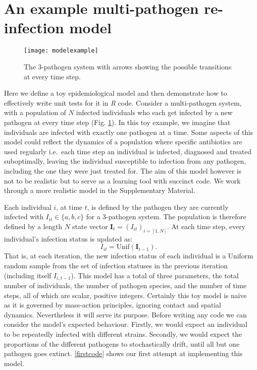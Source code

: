 \documentclass[]{elsarticle} %
\begin{document}
\hypertarget{an-example-multi-pathogen-re-infection-model}{%
\section{An example multi-pathogen re-infection model}\label{an-example-multi-pathogen-re-infection-model}}

\begin{figure}[h]

{\centering \texttt{[image: modelexample]} 

}

\caption{The 3-pathogen system with arrows showing the possible transitions at every time step.}\label{fig:modelexample}
\end{figure}

Here we define a toy epidemiological model and then demonstrate how to effectively write unit tests for it in \emph{R} code.
Consider a multi-pathogen system, with a population of \(N\) infected individuals who each get infected by a new pathogen at every time step (Fig. \ref{fig:modelexample}).
In this toy example, we imagine that individuals are infected with exactly one pathogen at a time.
Some aspects of this model could reflect the dynamics of a population where specific antibiotics are used regularly i.e.~each time step an individual is infected, diagnosed and treated suboptimally, leaving the individual susceptible to infection from any pathogen, including the one they were just treated for.
The aim of this model however is not to be realistic but to serve as a learning tool with succinct code.
We work through a more realistic model in the Supplementary Material.

Each individual \(i\), at time \(t\), is defined by the pathogen they are currently infected with \(I_{it} \in \{a, b, c\}\) for a 3-pathogen system.
The population is therefore defined by a length \(N\) state vector \(\mathbf{I}_t = (I_{it})_{i=[1,N]}\).
At each time step, every individual's infection status is updated as:
\[I_{it} = \text{Unif}(\mathbf{I}_{t-1}).\]
That is, at each iteration, the new infection status of each individual is a Uniform random sample from the set of infection statuses in the previous iteration (including itself \(I_{i,t-1}\)).
This model has a total of three parameters, the total number of individuals, the number of pathogen species, and the number of time steps, all of which are scalar, positive integers.
Certainly this toy model is naïve as it is governed by mass-action principles, ignoring contact and spatial dynamics.
Nevertheless it will serve its purpose.
Before writing any code we can consider the model's expected behaviour.
Firstly, we would expect an individual to be repeatedly infected with different strains.
Secondly, we would expect the proportions of the different pathogens to stochastically drift, until all but one pathogen goes extinct.
\ref{firstcode} shows our first attempt at implementing this model.
\newline
{}\label{firstcode}
\end{document}
